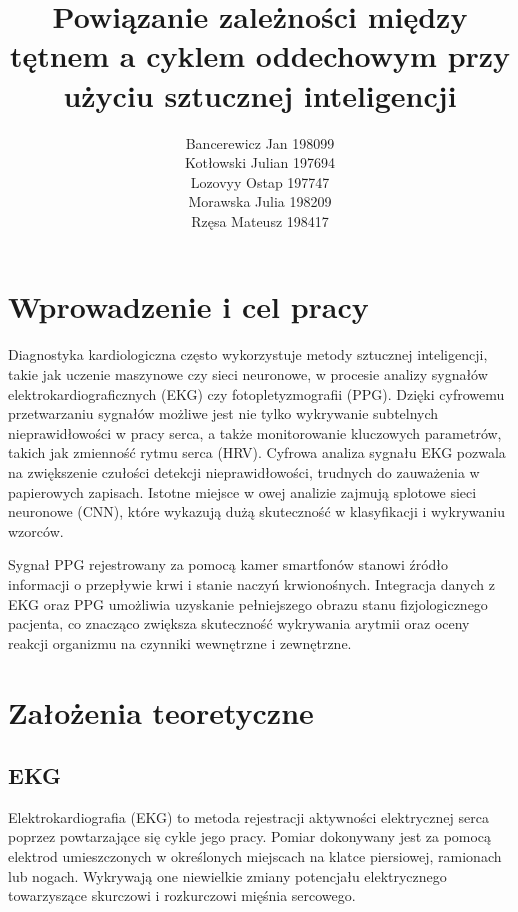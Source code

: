 \documentclass{article}
\title{Powiązanie zależności między tętnem a cyklem oddechowym przy użyciu sztucznej inteligencji
 }
\author{
    Bancerewicz Jan 198099 \\
    Kotłowski Julian 197694 \\
    Lozovyy Ostap 197747 \\
    Morawska Julia 198209 \\
    Rzęsa Mateusz 198417
}
\begin{document}
\maketitle
\newpage
\tableofcontents

\newpage

\section{Wprowadzenie i cel pracy}
Diagnostyka kardiologiczna często wykorzystuje metody sztucznej inteligencji, takie jak uczenie maszynowe czy sieci neuronowe, w procesie analizy sygnałów elektrokardiograficznych (EKG) czy fotopletyzmografii (PPG). Dzięki cyfrowemu przetwarzaniu sygnałów możliwe jest nie tylko wykrywanie subtelnych nieprawidłowości w pracy serca, a także monitorowanie kluczowych parametrów, takich jak zmienność rytmu serca (HRV).
Cyfrowa analiza sygnału EKG pozwala na zwiększenie czułości detekcji nieprawidłowości, trudnych do zauważenia w papierowych zapisach. Istotne  miejsce w owej analizie zajmują splotowe sieci neuronowe (CNN), które wykazują dużą skuteczność w klasyfikacji i wykrywaniu wzorców. 

Sygnał PPG rejestrowany za pomocą kamer smartfonów stanowi źródło informacji o przepływie krwi i stanie naczyń krwionośnych.
Integracja danych z EKG oraz PPG umożliwia uzyskanie pełniejszego obrazu stanu fizjologicznego pacjenta, co znacząco zwiększa skuteczność wykrywania arytmii oraz oceny reakcji organizmu na czynniki wewnętrzne i zewnętrzne.


\section{Założenia teoretyczne}
\subsection{EKG}
Elektrokardiografia (EKG) to metoda rejestracji aktywności elektrycznej serca poprzez powtarzające się cykle jego pracy. Pomiar dokonywany jest za pomocą elektrod umieszczonych w określonych miejscach na klatce piersiowej, ramionach lub nogach. Wykrywają one niewielkie zmiany potencjału elektrycznego towarzyszące skurczowi i rozkurczowi mięśnia sercowego.
\end{document}
